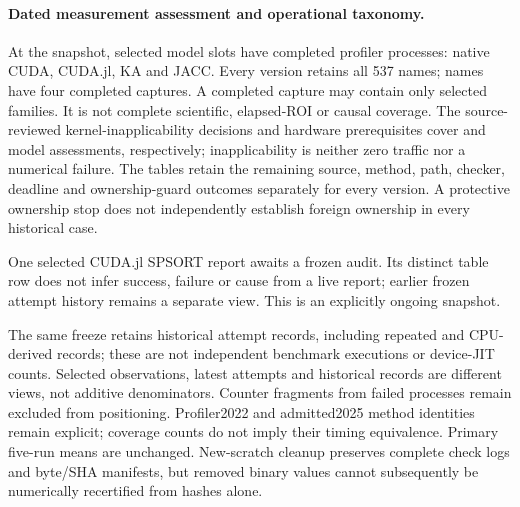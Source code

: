 
\paragraph{Dated measurement assessment and operational taxonomy.}
At the \VhundredSnapshotLabel{} snapshot, \VhundredCompleted{} selected model
slots have completed profiler processes: \VhundredNativeCompleted{} native
CUDA, \VhundredCudaJlCompleted{} CUDA.jl, \VhundredKaCompleted{} KA and
\VhundredJaccCompleted{} JACC. Every version retains all 537 names;
\VhundredAllFour{} names have four completed captures. A completed capture may
contain only selected families. It is not complete scientific, elapsed-ROI or
causal coverage. The source-reviewed kernel-inapplicability decisions and hardware
prerequisites cover \VhundredSourceNA{} and \VhundredHardware{} model assessments,
respectively; inapplicability is neither zero traffic nor a numerical failure.
The tables retain the remaining source, method, path, checker, deadline and
ownership-guard outcomes separately for every version. A protective ownership
stop does not independently establish foreign ownership in every historical case.

One selected CUDA.jl SPSORT report awaits a frozen audit. Its distinct table row
does not infer success, failure or cause from a live report; earlier frozen
attempt history remains a separate view. This is an explicitly ongoing snapshot.

The same freeze retains \VhundredAttempts{} historical attempt records, including
repeated and CPU-derived records; these are not independent benchmark executions
or device-JIT counts. Selected observations, latest attempts and historical records
are different views, not additive denominators. Counter fragments from failed
processes remain excluded from positioning. Profiler2022 and admitted2025 method
identities remain explicit; coverage counts do not imply their timing equivalence.
Primary five-run means are unchanged. New-scratch cleanup preserves complete
check logs and byte/SHA manifests, but removed binary values cannot subsequently
be numerically recertified from hashes alone.



